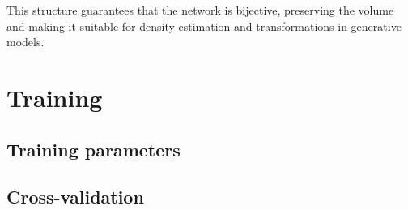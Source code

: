 \documentclass{article}
\theoremstyle{definition} \newtheorem{definition}{Definition}  \newtheorem{example}{Example}
\theoremstyle{remark} \newtheorem{remark}{Remark}
\newcounter{ct}
\begin{document}
This structure guarantees that the network is bijective, preserving the volume and making it suitable for density estimation and transformations in generative models.



%
%
%
%
%
%
%
%



\newpage
\section{Training}

\subsection{Training parameters}



\subsection{Cross-validation}
\end{document}

